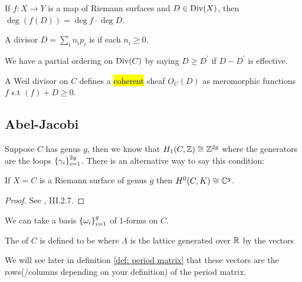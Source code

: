 \documentclass{article}
\begin{document}
\begin{prop}
	If $f:X \to Y$ is a map of Riemann surfaces and $D \in \operatorname{Div}(X)$, then $\deg(f(D)) = \deg f \cdot \deg D$.
\end{prop}

\begin{definition}
	A divisor $D = \sum_i n_i p_i$ is  if each $n_i \geq0$.  
\end{definition}

\begin{prop}
	We have a partial ordering on $\operatorname{Div}(C)$ by saying $D\geq D^\prime$ if $D-D^\prime$ is effective. 
\end{prop}

\begin{definition}
	A Weil divisor on $C$ defines a \hl{coherent} sheaf $O_C(D)$ as meromorphic functions $f$ s.t $(f)+D\geq0$. 
\end{definition}
\subsection{Abel-Jacobi}
Suppose $C$ has genus $g$, then we know that $H_1(C,\mathbb{Z}) \cong \mathbb{Z}^{2g}$ where the generators are the loops $\left\{ \gamma_i \right\}_{i=1}^{2g}$. There is an alternative way to say this condition:

\begin{prop}
	If $X=C$ is a Riemann surface of genus $g$ then $H^0(C,K)\cong \mathbb{C}^g$. 
\end{prop}
\begin{proof}
	See \cite{Farkas1992}, III.2.7.
\end{proof}
\begin{corollary}
	We can take a basis $\left\{ \omega_i \right\}_{i=1}^g$ of 1-forms on $C$. 
\end{corollary}
\begin{definition}
	The  of $C$ is defined to be 
	where $\Lambda$ is the lattice generated over $\mathbb{R}$ by the vectors 
\end{definition}

\begin{remark}
	We will see later in definition \ref{def: period matrix} that these vectors are the rows(/columns depending on your definition) of the period matrix. 
\end{remark}
\end{document}
